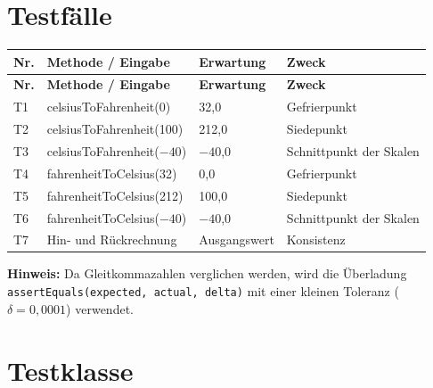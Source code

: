 \documentclass[
	fontsize=12pt,          %
	paper=a4,               %
	numbers=noenddot,       %
	listof=totoc,           %
	listof=entryprefix,     %
	listof=nochaptergap,    %
	bibliography=totoc,     %
	parskip=half,           %
	openany                 %
]{scrbook}
\begin{document}
\section*{Testfälle}

\begin{longtable}{| p{1.0cm} | p{4.5cm} | p{2.5cm} | p{3.0cm} |}
	\hline
	\textbf{Nr.} & \textbf{Methode / Eingabe} & \textbf{Erwartung} & \textbf{Zweck} \\ \hline
	\endfirsthead
	\hline
	\textbf{Nr.} & \textbf{Methode / Eingabe} & \textbf{Erwartung} & \textbf{Zweck} \\ \hline
	\endhead
	\hline
	\endfoot
	T1 & celsiusToFahrenheit(0) & 32,0 & Gefrierpunkt \\ \hline
	T2 & celsiusToFahrenheit(100) & 212,0 & Siedepunkt \\ \hline
	T3 & celsiusToFahrenheit($-40$) & $-40$,0 & Schnittpunkt der Skalen \\ \hline
	T4 & fahrenheitToCelsius(32) & 0,0 & Gefrierpunkt \\ \hline
	T5 & fahrenheitToCelsius(212) & 100,0 & Siedepunkt \\ \hline
	T6 & fahrenheitToCelsius($-40$) & $-40$,0 & Schnittpunkt der Skalen \\ \hline
	T7 & Hin- und Rückrechnung & Ausgangswert & Konsistenz \\ \hline
\end{longtable}

\textbf{Hinweis:} Da Gleitkommazahlen verglichen werden, wird die
Überladung \texttt{assertEquals(expected, actual, delta)} mit einer kleinen
Toleranz ($\delta = 0{,}0001$) verwendet.

\section*{Testklasse}
\end{document}
